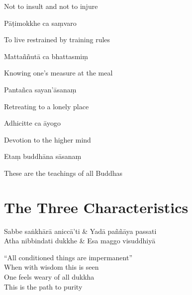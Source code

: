 \begin{cprenglish}
  Not to insult and not to injure
\end{cprenglish}

Pāṭimokkhe ca saṃvaro

\begin{cprenglish}
  To live restrained by training rules
\end{cprenglish}

Mattaññutā ca bhattasmiṃ

\begin{cprenglish}
  Knowing one's measure at the meal
\end{cprenglish}

Pantañca sayan'āsanaṃ

\begin{cprenglish}
  Retreating to a lonely place
\end{cprenglish}

Adhicitte ca āyogo

\begin{cprenglish}
  Devotion to the higher mind
\end{cprenglish}

Etaṃ buddhāna sāsanaṃ

\begin{cprenglish}
  These are the teachings of all Buddhas
\end{cprenglish}


\section{The Three Characteristics}

\begin{leader}
\end{leader}

\begin{twochants}
  Sabbe saṅkhārā aniccā’ti & Yadā paññāya passati\\
  Atha nibbindati dukkhe & Esa maggo visuddhiyā\\
\end{twochants}

\begin{english}
  “All conditioned things are impermanent”\\
  When with wisdom this is seen\\
  One feels weary of all dukkha\\
  This is the path to purity
\end{english}

